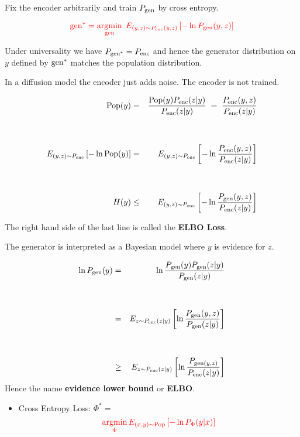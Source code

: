 {

Fix the encoder arbitrarily and train $P_{\mathrm{gen}}$ by cross entropy.

$${\color{red}\mathrm{gen}^* = \operatorname*{argmin}_{\mathrm{gen}}\;E_{(y,z) \sim P_{\mathrm{enc}}(y,z)}\left[-\ln P_{\mathrm{gen}}(y,z)\right]}$$

\vfill
Under universality we have $P_{\mathrm{gen}^*} = P_{\mathrm{enc}}$ and hence the generator distribution on $y$ defined by $\mathrm{gen}^*$ matches the population distribution.

\vfill
In a diffusion model the encoder just adds noise.  The encoder is not trained.



{\color{red} \huge
\begin{eqnarray*}
\mathrm{Pop}(y) & = & \frac{\mathrm{Pop}(y)P_{\mathrm{enc}}(z|y)}{P_{\mathrm{enc}}(z|y)} \;=\; \frac{P_{\mathrm{enc}}(y,z)}{P_{\mathrm{enc}}(z|y)} \\
\\
\\
E_{(y,z) \sim P_{\mathrm{enc}}}\left[ -\ln \mathrm{Pop}(y)\right] & = & E_{(y,z) \sim P_{\mathrm{enc}}}\left[ - \ln \frac{P_{\mathrm{enc}}(y,z)}{P_{\mathrm{enc}}(z|y)}\right] \\
\\
\\
H(y) & \leq & E_{(y,z) \sim P_{\mathrm{enc}}}\left[ - \ln \frac{P_{\mathrm{gen}}(y,z)}{P_{\mathrm{enc}}(z|y)}\right]
\end{eqnarray*}
}

\vfill
The right hand side of the last line is called the {\bf ELBO Loss}.

The generator is interpreted as a Bayesian model where $y$ is evidence for $z$.

{\color{red}
{\huge
\begin{eqnarray*}
\ln P_{\mathrm{gen}}(y) & =  & \ln \frac{P_{\mathrm{gen}}(y)P_{\mathrm{gen}}(z|y)}{P_{\mathrm{gen}}(z|y)} \\
\\
\\
& = & E_{z \sim P_{\mathrm{enc}}(z|y)} \left[\ln \frac{P_{\mathrm{gen}}(y,z)}{P_{\mathrm{gen}}(z|y)}\right] \\
\\
\\
& \geq & E_{z \sim P_{\mathrm{enc}}(z|y)}\left[\ln \frac{P_{\mathrm{gen}(y,z)}}{P_{\mathrm{enc}}(z|y)}\right]
\end{eqnarray*}
}}
\vfill
Hence the name {\bf evidence lower bound} or {\bf ELBO}.


\begin{itemize}
\item Cross Entropy Loss: $\Phi^* =$
$${\color{red} \operatorname*{argmin}_{\Phi} E_{(x,y)\sim \mathrm{Pop}}\left[-\ln P_\Phi(y|x)\right]}$$


\end{itemize}}
